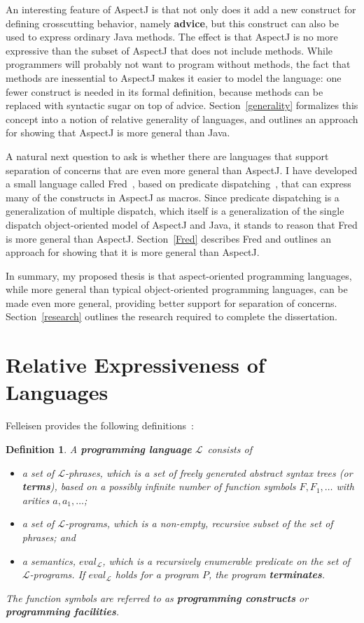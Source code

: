 \documentclass{article}
\newcommand{\defn}[1]{\textbf{#1}}
\newcommand{\Lplain}{\ensuremath{\mathcal{L}}}
\newcommand{\fac}{\ensuremath{F}}
\newcommand{\eval}[1]{\ensuremath{eval_#1}}
\newtheorem{definition}{Definition}[section]
\begin{document}
An interesting feature of AspectJ is that not only does it add a new
construct for defining crosscutting behavior, namely \defn{advice},
but this construct can also be used to express ordinary Java methods.
The effect is that AspectJ is no more expressive than the subset of
AspectJ that does not include methods.  While programmers will
probably not want to program without methods, the fact that methods
are inessential to AspectJ makes it easier to model the language: one
fewer construct is needed in its formal definition, because methods
can be replaced with syntactic sugar on top of advice.
Section~\ref{generality} formalizes this concept into a notion of
relative generality of languages, and outlines an approach for showing
that AspectJ is more general than Java.

A natural next question to ask is whether there are languages that
support separation of concerns that are even more general than
AspectJ.  I have developed a small language called Fred~\cite{Fred},
based on predicate dispatching~\cite{predicate-dispatch}, that can
express many of the constructs in AspectJ as macros.  Since predicate
dispatching is a generalization of multiple dispatch, which itself is
a generalization of the single dispatch object-oriented model of
AspectJ and Java, it stands to reason that Fred is more general than
AspectJ.  Section~\ref{Fred} describes Fred and outlines an approach
for showing that it is more general than AspectJ.

In summary, my proposed thesis is that aspect-oriented programming
languages, while more general than typical object-oriented programming
languages, can be made even more general, providing better support for
separation of concerns.  Section~\ref{research} outlines the research
required to complete the dissertation.

\section{Relative Expressiveness of Languages}
\label{expressiveness}

Felleisen provides the following definitions~\cite{expressive-power}:

\begin{definition}
A \defn{programming language} \Lplain\ consists of
\begin{itemize}
\item a set of \Lplain-phrases, which is a set of freely generated
      abstract syntax trees (or \defn{terms}), based on a possibly
      infinite number of function symbols $\fac, \fac_1,
      \ldots$ with arities $a, a_1, \ldots$;
\item a set of \Lplain-programs, which is a non-empty, recursive
      subset of the set of phrases; and
\item a semantics, \eval{\Lplain}, which is a recursively enumerable
      predicate on the set of \Lplain-programs.  If $eval_\Lplain$
      holds for a program $P$, the program \defn{terminates}.
\end{itemize}
The function symbols are referred to as \defn{programming constructs}
or \defn{programming facilities}.
\end{definition}
\end{document}
